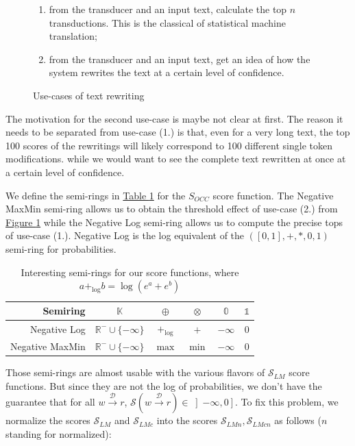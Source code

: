 \documentclass[a4paper, 11pt, onepage]{scrreprt}
\newcommand\tableref[1]{\hyperref[#1]{Table \ref*{#1}}}
\newcommand\figureref[1]{\hyperref[#1]{Figure \ref*{#1}}}
\newcommand\maps[1]{\xrightarrow{\mathcal{#1}}}
\begin{document}
\begin{figure}[H]
  \centering
  \begin{enumerate}
  \item from the transducer and an input text, calculate the top $n$
    transductions. This is the classical of statistical machine
    translation;
  \item from the transducer and an input text, get an idea of how the
    system rewrites the text at a certain level of confidence.
  \end{enumerate}
  
  \caption{Use-cases of text rewriting}
\label{fig:use-cases}
\end{figure}

The motivation for the second use-case is maybe not clear at
first. The reason it needs to be separated from use-case (1.) is that,
even for a very long text, the top 100 scores of the rewritings will
likely correspond to 100 different single token modifications.  while we
would want to see the complete text rewritten at once at a certain
level of confidence.

We define the semi-rings in \tableref{tab:semi-rings} for the
$S_{OCC}$ score function. The Negative MaxMin semi-ring allows us to
obtain the threshold effect of use-case (2.) from
\figureref{fig:use-cases} while the Negative Log semi-ring allows us
to compute the precise tops of use-case (1.). Negative Log is the log
equivalent of the $(\left[0, 1\right], +, *, 0, 1)$ semi-ring for
probabilities.

\begin{table}[H]
  \centering
  \caption{Interesting semi-rings for our score functions, where
    $a +_{\log} b = \log\left(e^a + e^b\right)$}
  \begin{tabular}{rccccc}
    \toprule
    Semiring & $\mathbb{K}$ & $\oplus$ & $\otimes$ & $\mathbb{0}$ & $\mathbb{1}$
    \\
    \midrule
    Negative Log & $\mathbb{R}^{-} \cup \{-\infty\}$ & $+_{\log}$ & $+$ & $-\infty$ & $0$ \\
    Negative MaxMin & $\mathbb{R}^{-} \cup \{-\infty\}$ & $\max$ & $\min$ & $-\infty$ & $0$ \\
  \end{tabular}
  \label{tab:semi-rings}
\end{table}

Those semi-rings are almost usable with the various flavors of
$\mathcal{S}_{LM}$ score functions. But since they are not the log of
probabilities, we don't have the guarantee that for all $w \maps{D}
r$, $\mathcal{S} \left( w \maps{D} r \right) \in \left]-\infty,
  0\right]$. To fix this problem, we normalize the scores
$\mathcal{S}_{LM}$ and $\mathcal{S}_{LMc}$ into the scores
$\mathcal{S}_{LMn}, \mathcal{S}_{LMcn}$ as follows ($n$ standing for
normalized):
\end{document}
